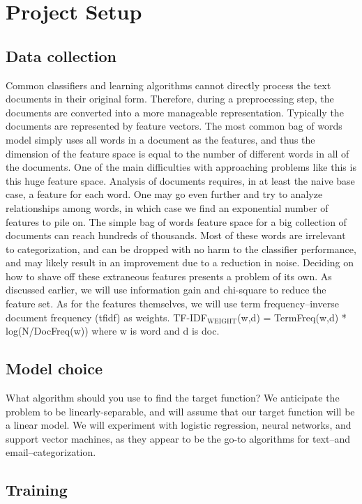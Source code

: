 \documentclass[11pt]{article}
\begin{document}
\section{Project Setup}
\label{sec-4}
\subsection{Data collection}
\label{sec-4-1}


Common classifiers and learning algorithms cannot directly process the text documents in their original form. Therefore, during a preprocessing step, the documents are converted into a more manageable representation. Typically the documents are represented by feature vectors. The most common bag of words model simply uses all words in a document as the features, and thus the dimension of the feature space is equal to the number of different words in all of the documents.
One of the main difficulties with approaching problems like this is this huge feature space. Analysis of documents requires, in at least the naive base case, a feature for each word. One may go even further and try to analyze relationships among words, in which case we find an exponential number of features to pile on. The simple bag of words feature space for a big collection of documents can reach hundreds of thousands. Most of these words are irrelevant to categorization, and can be dropped with no harm to the classifier performance, and may likely result in an improvement due to a reduction in noise. Deciding on how to shave off these extraneous features presents a problem of its own. As discussed earlier, we will use information gain and chi-square to reduce the feature set.
As for the features themselves, we will use term frequency–inverse document frequency (tfidf) as weights. TF-IDF$_{\mathrm{WEIGHT}}$(w,d) = TermFreq(w,d) * log(N/DocFreq(w)) where w is word and d is doc.
\subsection{Model choice}
\label{sec-4-2}


What algorithm should you use to find the target function?
We anticipate the problem to be linearly-separable, and will assume that our target function will be a linear model. We will experiment with logistic regression, neural networks, and support vector machines, as they appear to be the go-to algorithms for text--and email--categorization.
\subsection{Training}
\label{sec-4-3}
\end{document}
